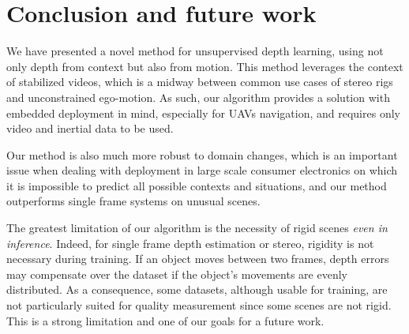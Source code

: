 \documentclass[runningheads]{llncs}
\begin{document}
\section{Conclusion and future work}

We
have
presented a novel method for unsupervised depth learning, using not only depth from context but also from motion. This method leverages the context of stabilized videos, which is a midway between
common
use cases of stereo rigs and unconstrained ego-motion. As such, our algorithm provides a solution with embedded deployment in mind, especially for UAVs navigation, and requires only video and inertial data to be used.

Our method is also much more robust to domain changes, which is an important issue when dealing with deployment in large scale consumer electronics on which it is impossible to predict all possible contexts and situations, and our method outperforms single frame systems on unusual scenes.

The greatest limitation of our algorithm is the necessity of rigid scenes \emph{even in inference}. Indeed, for single frame depth estimation or stereo, rigidity is not necessary during training. If an object moves between two frames, depth errors may compensate over the dataset if the object’s movements are evenly distributed. As a consequence, some datasets, although usable for training, are not particularly suited for quality measurement since some scenes are not rigid. This is a strong limitation and one of our goals for a future work.




\end{document}
